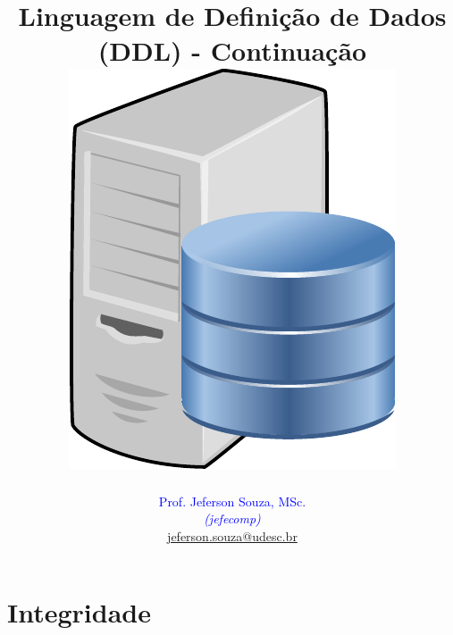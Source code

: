 \documentclass[xcolor=x11names,compress]{beamer}
\begin{document}
\title[Linguagem de Definição de Dados (DDL) \hskip20mm \insertframenumber / \inserttotalframenumber  \hskip33.5mm \inserttitlegraphic]{Linguagem de Definição de Dados (DDL) - Continuação \\[4mm]
\includegraphics[keepaspectratio,width=.25\textwidth]{database-server}}
\author[@2018 Prof. Jeferson Souza, MSc (jefecomp) - All rights reserved.]{
	\textcolor{blue}{Prof. Jeferson Souza, MSc.} \\[1mm] 
	\textcolor{blue}{\textit{{\footnotesize (jefecomp) }}}\\[1.5mm]
	 \underline{{\footnotesize jeferson.souza@udesc.br}}
	 \vspace*{1mm}
}

\date{}


\begin{frame}
\titlepage
\end{frame}


\section{Integridade}
\end{document}
